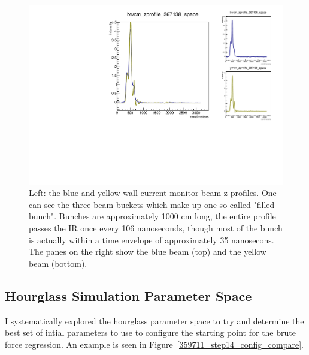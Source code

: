 \begin{figure}
\begin{center}
\includegraphics[width=\linewidth,height=\textheight,keepaspectratio]{./figures/367138_wcm_zprofile}
\caption{ 
Left: the blue and yellow wall current monitor beam z-profiles. One can see the
three beam buckets which make up one so-called "filled bunch". Bunches are
approximately 1000 cm long, the entire profile passes the IR once every 106
nanoseconds, though most of the bunch is actually within a time envelope of
approximately 35 nanosecons. The panes on the right show the blue beam (top)
and the yellow beam (bottom).
}
\label{fig:367138_wcm_zprofile}
\end{center}
\end{figure}
\clearpage

\subsection{Hourglass Simulation Parameter Space}

I systematically explored the hourglass parameter space to try and determine the
best set of intial parameters to use to configure the starting point for the
brute force regression. An example is seen in
Figure~\ref{359711_step14_config_compare}. 

